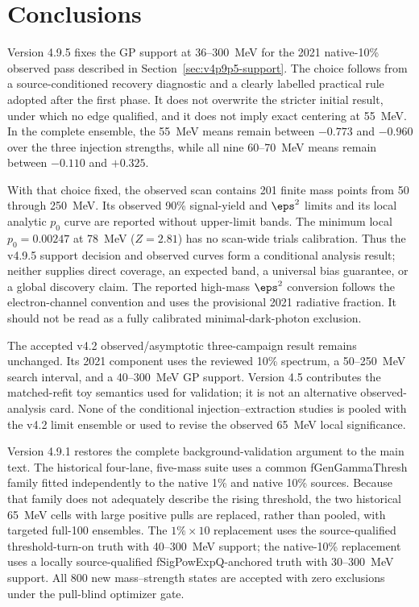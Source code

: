 \section{Conclusions}
\label{sec:conclusions}

Version 4.9.5 fixes the GP support at 36--300~MeV for the 2021 native-10\%
observed pass described in Section~\ref{sec:v4p9p5-support}.  The choice follows from
a source-conditioned recovery diagnostic and a clearly labelled practical rule adopted
after the first phase.  It does not overwrite the stricter initial result, under which
no edge qualified, and it does not imply exact centering at 55~MeV.  In the complete
ensemble, the 55~MeV means remain between $-0.773$ and $-0.960$ over the three
injection strengths, while all nine 60--70~MeV means remain between $-0.110$ and
$+0.325$.

With that choice fixed, the observed scan contains 201 finite mass points from 50 through
250~MeV.  Its observed 90\% \CLs{} signal-yield and $\eps^2$ limits and its local
analytic $p_0$ curve are reported without upper-limit bands.  The minimum local
$p_0=0.00247$ at 78~MeV ($Z=2.81$) has no scan-wide trials calibration.  Thus the
v4.9.5 support decision and observed curves form a conditional analysis result; neither
supplies direct coverage, an expected band, a universal bias guarantee, or a global
discovery claim.  The reported high-mass $\eps^2$ conversion follows the electron-channel
convention and uses the provisional 2021 radiative fraction.  It should not be read as a
fully calibrated minimal-dark-photon exclusion.

The accepted v4.2 observed/asymptotic three-campaign result remains unchanged.  Its
2021 component uses the reviewed 10\% spectrum, a 50--250~MeV search interval, and a
40--300~MeV GP support.  Version 4.5 contributes the matched-refit toy semantics used
for validation; it is not an alternative observed-analysis card.  None of the
conditional injection--extraction studies is pooled with the v4.2 limit ensemble or
used to revise the observed 65~MeV local significance.

Version 4.9.1 restores the complete background-validation argument to the main text.
The historical four-lane, five-mass suite uses a common
fGenGammaThresh family fitted independently to the native 1\% and native
10\% sources.  Because that family does not adequately describe the rising threshold,
the two historical 65~MeV cells with large positive pulls are replaced, rather than
pooled, with targeted full-100 ensembles.  The $1\%\times10$ replacement uses the
source-qualified threshold-turn-on truth with 40--300~MeV support; the
native-10\% replacement uses a locally source-qualified
fSigPowExpQ-anchored truth with 30--300~MeV support.  All 800 new
mass--strength states are accepted with zero exclusions under the pull-blind optimizer
gate.

